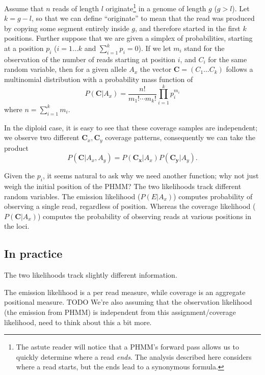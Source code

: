 Assume that $n$ reads of length $l$ originate\footnote{The astute reader will
notice that a PHMM's forward pass allows us to quickly determine where a read
\emph{ends}. The analysis described here considers where a read starts, but the
ends lead to a synonymous formula.}
in a genome of length $g$ ($g>l$).
Let $k=g-l$, so that we can define ``originate'' to mean that the read was produced
by copying some segment entirely inside $g$,
and therefore started in the first $k$ positions.
Further suppose that we are given a simplex of probabilities,
starting at a position $p_{i}$
($i=1\ldots k$ and $\sum_{i=1}^{k}p_{i} = 0$).
If we let $m_{i}$ stand for the observation of the number of reads starting at position $i$,
and $C_{i}$ for the same random variable,
then for a given allele $A_{x}$ the vector $\mathbf{C}=(C_{1} \ldots C_{k})$
follows a multinomial distribution with a probability mass function of
\begin{equation}
  P(\mathbf{C}|A_{x}) = \frac{n!}{m_{1}! \cdots m_{k}!} \prod_{i=1}^{k}p_{i}^{m_{i}}
\end{equation}
where $n=\sum_{i=1}^{k}m_{i}$.

In the diploid case,
it is easy to see that these coverage samples are independent;
we observe two different $\mathbf{C}_{x},\mathbf{C}_{y}$ coverage patterns,
consequently we can take the product
\begin{equation}
  P(\mathbf{C}|A_{x},A_{y}) = P(\mathbf{C_{x}}|A_{x}) P(\mathbf{C_{y}}|A_{y}).
\end{equation}

Given the $p_{i}$, it seems natural to ask why we need another function;
why not just weigh the initial position of the PHMM?
The two likelihoods track different random variables.
The emission likelihood ($P(E|A_{x})$) computes probability of observing a single read,
regardless of position.
Whereas the coverage likelihood ($P(\mathbf{C}|A_{x})$) computes the probability of observing
reads at various positions in the loci.

\subsection{In practice}

The two likelihoods track slightly different information.

The emission likelihood is a per read measure,
while coverage is an aggregate positional measure.
TODO
We're also assuming that the observation likelihood (the emission from PHMM) is
independent from this assignment/coverage likelihood, need to think about this
a bit more.


